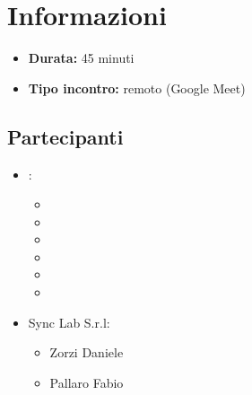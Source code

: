 \section{Informazioni}
\begin{itemize}
	\item \textbf{Durata:} 45 minuti
	\item \textbf{Tipo incontro:} remoto (Google Meet)
\end{itemize}

\subsection{Partecipanti}

\begin{itemize}
	\item \GroupName:
	\begin{itemize}
		\item \tommaso
		\item \marco
		\item \raul
		\item \sebastiano
		\item \martina
		\item \riccardo
	\end{itemize}

	\item Sync Lab S.r.l:
	\begin{itemize}
		\item Zorzi Daniele
		\item Pallaro Fabio
	\end{itemize}
\end{itemize}

\clearpage
